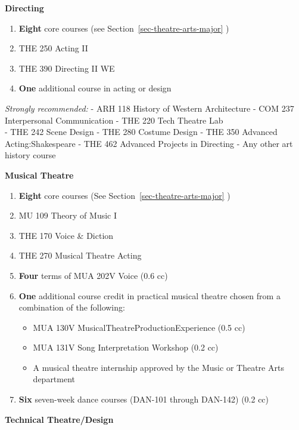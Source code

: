 \documentclass[
  letterpaper,
]{scrbook}
\providecommand{\tightlist}{%
  \setlength{\itemsep}{0pt}\setlength{\parskip}{0pt}}
\begin{document}
\textbf{Directing}

\begin{enumerate}
\def\labelenumi{\arabic{enumi}.}
\item
  \textbf{Eight} core courses (see Section~\ref{sec-theatre-arts-major}
  )
\item
  THE 250 Acting II
\item
  THE 390 Directing II WE
\item
  \textbf{One} additional course in acting or design
\end{enumerate}

\emph{Strongly recommended:} - ARH 118 History of Western Architecture -
COM 237 Interpersonal Communication - THE 220 Tech Theatre Lab\\
- THE 242 Scene Design - THE 280 Costume Design - THE 350 Advanced
Acting:Shakespeare - THE 462 Advanced Projects in Directing - Any other
art history course

\textbf{Musical Theatre}

\begin{enumerate}
\def\labelenumi{\arabic{enumi}.}
\item
  \textbf{Eight} core courses (See Section~\ref{sec-theatre-arts-major}
  )
\item
  MU 109 Theory of Music I
\item
  THE 170 Voice \& Diction
\item
  THE 270 Musical Theatre Acting
\item
  \textbf{Four} terms of MUA 202V Voice (0.6 cc)
\item
  \textbf{One} additional course credit in practical musical theatre
  chosen from a combination of the following:

  \begin{itemize}
  \tightlist
  \item
    MUA 130V MusicalTheatreProductionExperience (0.5 cc)
  \item
    MUA 131V Song Interpretation Workshop (0.2 cc)
  \item
    A musical theatre internship approved by the Music or Theatre Arts
    department
  \end{itemize}
\item
  \textbf{Six} seven-week dance courses (DAN-101 through DAN-142) (0.2
  cc)
\end{enumerate}

\textbf{Technical Theatre/Design}
\end{document}
